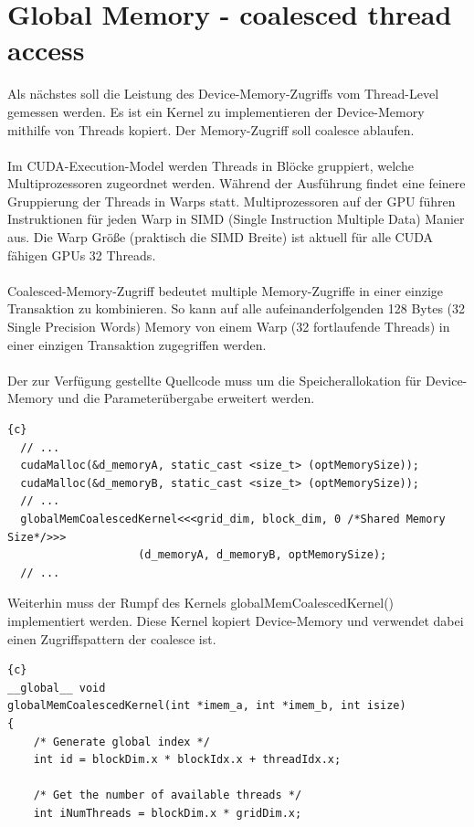 \documentclass{article}
\newcommand{\enterProblemHeader}[1]{
}
\newcommand{\exitProblemHeader}[1]{
}
\newcounter{homeworkProblemCounter} %
\newcommand{\homeworkProblemName}{}
\newenvironment{homeworkProblem}[1][Problem \arabic{homeworkProblemCounter}]{ %
\stepcounter{homeworkProblemCounter} %
\renewcommand{\homeworkProblemName}{#1} %
\section{\homeworkProblemName} %
}{
}
\begin{document}

\begin{homeworkProblem}[Global Memory - coalesced thread access]
Als nächstes soll die Leistung des Device-Memory-Zugriffs vom Thread-Level gemessen werden.
Es ist ein Kernel zu implementieren der Device-Memory mithilfe von Threads kopiert. Der
Memory-Zugriff soll coalesce ablaufen.
\\\\
Im CUDA-Execution-Model werden Threads in Blöcke gruppiert, welche Multiprozessoren
zugeordnet werden. Während der Ausführung findet eine feinere Gruppierung der Threads in
Warps statt. Multiprozessoren auf der GPU führen Instruktionen für jeden Warp in
SIMD (Single Instruction Multiple Data) Manier aus. Die Warp Größe (praktisch die
SIMD Breite) ist aktuell für alle CUDA fähigen GPUs 32 Threads.
\\\\
Coalesced-Memory-Zugriff bedeutet multiple Memory-Zugriffe in einer einzige Transaktion
zu kombinieren. So kann auf alle aufeinanderfolgenden 128 Bytes 
(32 Single Precision Words) Memory von einem Warp (32 fortlaufende Threads) in einer
einzigen Transaktion zugegriffen werden. 
\\\\
Der zur Verfügung gestellte Quellcode muss um die Speicherallokation für Device-Memory
und die Parameterübergabe erweitert werden.
\begin{lstlisting}{c}
  // ...
  cudaMalloc(&d_memoryA, static_cast <size_t> (optMemorySize));
  cudaMalloc(&d_memoryB, static_cast <size_t> (optMemorySize));
  // ...
  globalMemCoalescedKernel<<<grid_dim, block_dim, 0 /*Shared Memory Size*/>>>
                    (d_memoryA, d_memoryB, optMemorySize);
  // ...
\end{lstlisting}
Weiterhin muss der Rumpf des Kernels globalMemCoalescedKernel() implementiert werden.
Diese Kernel kopiert Device-Memory und verwendet dabei einen Zugriffspattern der
coalesce ist.
\begin{lstlisting}{c}
__global__ void 
globalMemCoalescedKernel(int *imem_a, int *imem_b, int isize)
{
    /* Generate global index */
    int id = blockDim.x * blockIdx.x + threadIdx.x;
    
    /* Get the number of available threads */
    int iNumThreads = blockDim.x * gridDim.x;
    

\end{lstlisting}
\end{homeworkProblem}
\end{document}
